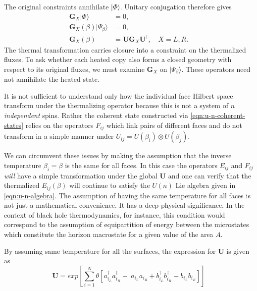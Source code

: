 \documentclass[twocolumn,draft,aps,nofootinbib,nobibnotes,final]{revtex4-2}
\newcommand{\mb}[1]{\mathbf{#1}}
\begin{document}
The original constraints annihilate $|\Phi\rangle$. Unitary conjugation therefore gives
\begin{equation}\label{eqn:closure-preserved}
\begin{aligned}
 \boldsymbol{G}_X|\Phi\rangle&=0,\\
 \boldsymbol{G}_X(\beta)|\Psi_\beta\rangle&=0,\\
 \boldsymbol{G}_X(\beta)&=\mb{U}\boldsymbol{G}_X\mb{U}^{\dagger},\quad X=L,R.
\end{aligned}
\end{equation}
The thermal transformation carries closure into a constraint on the thermalized fluxes. To ask whether each heated copy also forms a closed geometry with respect to its original fluxes, we must examine $\boldsymbol{G}_X$ on $|\Psi_\beta\rangle$. These operators need not annihilate the heated state.

It is not sufficient to understand only how the individual face Hilbert space transform under the thermalizing operator because this is not a system of $ n $ \textit{independent} spins. Rather the coherent state constructed via \eqref{eqn:u-n-coherent-states} relies on the operators $ F_{ij} $ which link pairs of different faces and do not transform in a simple manner under $ U_{ij} = U(\beta_i) \otimes U(\beta_j) $.

We can circumvent these issues by making the assumption that the inverse temperature $ \beta_i = \beta $ is the same for all faces. In this case the operators $ E_{ij} $ and $ F_{ij} $ \textit{will} have a simple transformation under the global $ \mb{U} $ and one can verify that the thermalized $ E_{ij}(\beta) $ will continue to satisfy the $ U(n) $ Lie algebra given in \eqref{eqn:u-n-algebra}. The assumption of having the same temperature for all faces is not just a mathematical convenience. It has a deep physical significance. In the context of black hole thermodynamics, for instance, this condition would correspond to the assumption of equipartition of energy between the microstates which constitute the horizon macrostate for a given value of the area $ A $.

By assuming same temperature for all the surfaces, the expression for $ \mb{U}$ is given as
\begin{equation}
	\mb{U} = exp\left[\sum_{i=1}^{N}\theta[ a_{i_{L}}^{\dagger} a_{i_{R}}^{\dagger} - \ a_{i_{L}} a_{i_{R}} + b_{i_{L}}^{\dagger} b_{i_{R}}^{\dagger} - b_{i_{L}} b_{i_{R}}]\right]
\end{equation}
\end{document}
